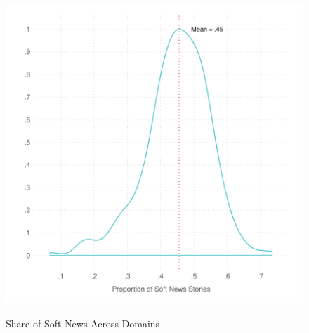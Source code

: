 \documentclass[12pt, letterpaper]{article}
\begin{document}
\clearpage
\begin{figure}[!htbp]
\centering
\caption{Share of Soft News Across Domains}
\includegraphics[scale=.9]{../figs/prop_soft_news_by_domain.pdf}
\label{fig:agg_density_domain}
\end{figure}
\end{document}
